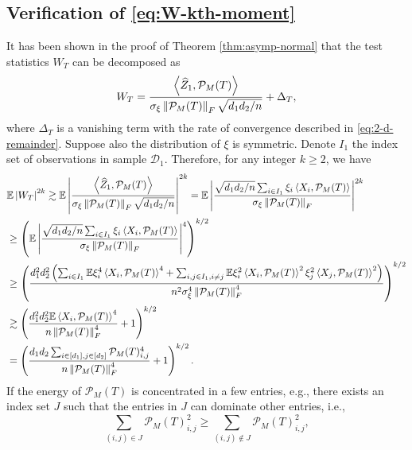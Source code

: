 \documentclass[12pt]{article}
\newcommand{\tF}{{\rm F}}
\newcommand{\abs}[1]{\left\lvert#1\right\rvert}
\newcommand{\norm}[1]{\left\lVert#1\right\rVert}
\newcommand{\E}{\mathbb{E}}
\newcommand{\cP}{\mathcal{P}}
\def\calD{{\mathcal D}}
\theoremstyle{plain}
\begin{document}
\subsection{Verification of \eqref{eq:W-kth-moment}}\label{sec:proof-w-k-mom}
It has been shown in the proof of Theorem \ref{thm:asymp-normal} that the test statistics $W_T$ can be decomposed as 
\begin{equation*}
	W_{T} = \frac{\left\langle  \widehat{Z}_1 , \cP_M(T) \right\rangle }{\sigma_{\xi} \norm{\cP_M(T) }_\tF  \sqrt{d_1 d_2/n}}+ \Delta_{T},
\end{equation*}
where $\Delta_T$ is a vanishing term with the rate of convergence described in \eqref{eq:2-d-remainder}. Suppose also the distribution of $\xi$ is symmetric. Denote $I_1$ the index set of observations in sample $\calD_1$. 
Therefore, for any integer $k\ge 2$, we have
\begin{equation*}
	\begin{aligned}
		&\E \abs{W_{T} }^{2k} \gtrsim \E \abs{\frac{\left\langle  \widehat{Z}_1 , \cP_M(T) \right\rangle }{\sigma_{\xi} \norm{\cP_M(T) }_\tF  \sqrt{d_1 d_2/n}}}^{2k} = \E \abs{\frac{\sqrt{d_1 d_2/n} \sum_{i\in I_1} \xi_i \left\langle  X_i , \cP_M(T) \right\rangle }{\sigma_{\xi} \norm{\cP_M(T) }_\tF }}^{2k} \\
		& \ge \left(\E \abs{\frac{\sqrt{d_1 d_2/n} \sum_{i\in I_1} \xi_i \left\langle  X_i , \cP_M(T) \right\rangle }{\sigma_{\xi} \norm{\cP_M(T) }_\tF }}^{4}  \right)^{k/2} \\
		& \ge \left(  \frac{d_1^2 d_2^2 \left( \sum_{i\in I_1} \E\xi_i^4 \left\langle  X_i , \cP_M(T) \right\rangle^4 + \sum_{i,j\in I_1, i\neq j}\E\xi_i^2 \left\langle  X_i , \cP_M(T) \right\rangle^2\xi_j^2 \left\langle  X_j , \cP_M(T) \right\rangle^2 \right) }{n^2\sigma_{\xi}^4 \norm{\cP_M(T) }^4_\tF }  \right)^{k/2} \\
		& \gtrsim \left(  \frac{d_1^2 d_2^2 \E\left\langle  X_i , \cP_M(T) \right\rangle^4 }{n \norm{\cP_M(T) }^4_\tF } +1 \right)^{k/2} \\
		& = \left(  \frac{d_1 d_2 \sum_{i\in [d_1],j\in[d_2]} \cP_M(T)_{i,j}^4 }{n \norm{\cP_M(T) }^4_\tF } +1 \right)^{k/2}. 
	\end{aligned}
\end{equation*}
If the energy of $\cP_M(T)$ is concentrated in a few entries, e.g., there exists an index set $J$ such that the entries in $J$ can dominate other entries, i.e., 
\begin{equation*}
	\sum_{(i,j)\in J} \cP_M(T)_{i,j}^2 \ge  \sum_{(i,j)\notin J} \cP_M(T)_{i,j}^2,
\end{equation*}
\end{document}

